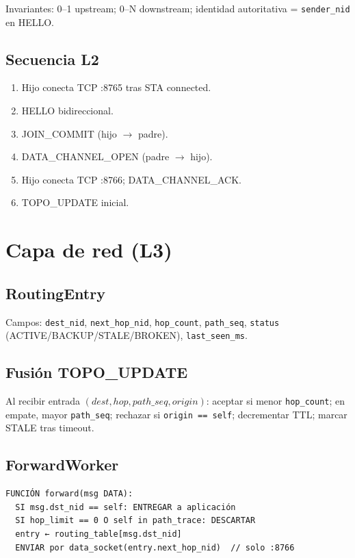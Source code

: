 Invariantes: 0--1 upstream; 0--N downstream; identidad autoritativa = \texttt{sender\_nid} en HELLO.

\subsection{Secuencia L2}

\begin{enumerate}
  \item Hijo conecta TCP :8765 tras STA connected.
  \item HELLO bidireccional.
  \item JOIN\_COMMIT (hijo $\rightarrow$ padre).
  \item DATA\_CHANNEL\_OPEN (padre $\rightarrow$ hijo).
  \item Hijo conecta TCP :8766; DATA\_CHANNEL\_ACK.
  \item TOPO\_UPDATE inicial.
\end{enumerate}

\section{Capa de red (L3)}
\label{sec:diseno-l3}

\subsection{RoutingEntry}

Campos: \texttt{dest\_nid}, \texttt{next\_hop\_nid}, \texttt{hop\_count}, \texttt{path\_seq}, \texttt{status} (ACTIVE/BACKUP/STALE/BROKEN), \texttt{last\_seen\_ms}.

\subsection{Fusión TOPO\_UPDATE}

Al recibir entrada $(dest, hop, path\_seq, origin)$: aceptar si menor \texttt{hop\_count}; en empate, mayor \texttt{path\_seq}; rechazar si \texttt{origin == self}; decrementar TTL; marcar STALE tras timeout.

\subsection{ForwardWorker}

\begin{verbatim}
FUNCIÓN forward(msg DATA):
  SI msg.dst_nid == self: ENTREGAR a aplicación
  SI hop_limit == 0 O self in path_trace: DESCARTAR
  entry ← routing_table[msg.dst_nid]
  ENVIAR por data_socket(entry.next_hop_nid)  // solo :8766
\end{verbatim}

